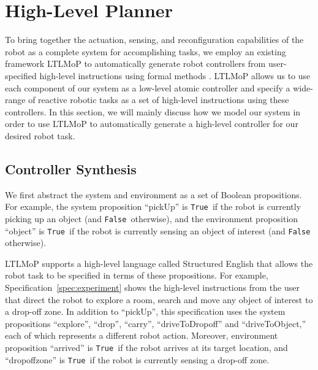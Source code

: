 \documentclass[conference]{IEEEtran}
\newcommand{\lt}{{\tt True }}
\newcommand{\lf}{{\tt False }}
\begin{document}
\section{High-Level Planner}
\label{sec:high-level}
%

To bring together the actuation, sensing, and reconfiguration capabilities of  the  robot as a complete system for accomplishing  tasks, we employ an existing framework LTLMoP to automatically generate robot controllers from user-specified high-level instructions using formal methods \cite{DBLP:conf/iros/FinucaneJK10,DBLP:journals/trob/Kress-GazitFP09}.
LTLMoP allows us to use each component of our system as a low-level atomic controller and specify a wide-range of reactive robotic tasks as a set of high-level instructions using these controllers.
In this section, we will mainly discuss how we model our system in order to use LTLMoP to automatically generate a high-level controller for our desired robot task.

\subsection{Controller Synthesis}
We first abstract the system and environment as a set of Boolean propositions.
For example, the system proposition ``pickUp'' is \lt if the robot is currently picking up an object (and \lf otherwise), and
the environment proposition ``object'' is \lt if the robot is currently sensing an object of interest (and \lf otherwise).

LTLMoP supports a high-level language called Structured English that allows the robot task to be specified in terms of these propositions.
For example, Specification~\ref{spec:experiment} shows the high-level instructions from the user that direct the robot to explore a room, search and move any object of interest to a drop-off zone.
In addition to ``pickUp'', this specification uses the system propositions ``explore'', ``drop'', ``carry'', ``driveToDropoff'' and ``driveToObject,'' each of which represents a different robot action.
Moreover, environment proposition ``arrived'' is \lt if the robot arrives at its target location, and ``dropoffzone'' is \lt if the robot is currently sensing a drop-off zone.
\end{document}
